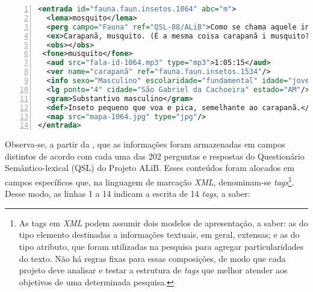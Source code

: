 \documentclass[portuguese]{textolivre}
\begin{document}
\begin{lstlisting}[language=XML, label=tab01, caption={Estrutura do arquivo \emph{XML},}, source={Elaboração do autor.}, numbers=left]
<entrada id="fauna.faun.insetos.1064" abc="m">
  <lema>mosquito</lema>
  <perg campo="Fauna" ref="QSL-88/ALiB">Como se chama aquele inseto pequeno, de perninhas compridas, que canta no ouvido das pessoas, de noite?</perg>
  <ex>Carapanã, musquito. (É a mesma coisa carapanã i musquito?) É a mesma coisa. (É o mesmo bichinho?) É o mesmo bichinho.</ex> 
  <obs></obs>   
 <fone>musquito</fone>
  <aud src="fala-id-1064.mp3" type="mp3">1:05:15</aud>
  <ver name="carapanã" ref="fauna.faun.insetos.1534"/>
  <info sexo="Masculino" escolaridade="fundamental" idade="jovem" >29 anos</info> 
  <lg ponto="4" cidade="São Gabriel da Cachoeira" estado="AM"/>
  <gram>Substantivo masculino</gram>
  <def>Inseto pequeno que voa e pica, semelhante ao carapanã.</def>
  <map src="mapa-1064.jpg" type="jpg"/>
</entrada>
\end{lstlisting} %


Observa-se, a partir da , que as informações foram armazenadas em campos distintos de acordo com cada uma das 202 perguntas e respostas do Questionário Semântico-lexical (QSL) do Projeto ALiB. Esses conteúdos foram alocados em campos específicos que, na linguagem de marcação \emph{XML}, denominam-se \emph{tags}\footnote{As tags em \emph{XML} podem assumir dois modelos de apresentação, a saber: as do tipo elemento destinadas a informações textuais, em geral, extensas; e as do tipo atributo, que foram utilizadas na pesquisa para agregar particularidades do texto. Não há regras fixas para essas composições, de modo que cada projeto deve analisar e testar a estrutura de \emph{tags} que melhor atender aos objetivos de uma determinada pesquisa.}. Desse modo, as linhas 1 a 14 indicam a escrita de 14 \emph{tags}, a saber:
\end{document}
